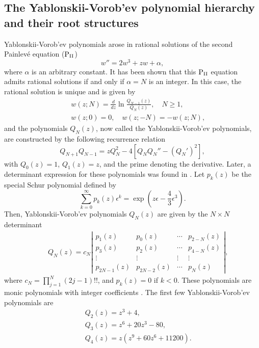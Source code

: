 \documentclass[amsmath,amssymb]{revtex4}
\def\[{\begin{equation}}
\def\]{\end{equation}}
\begin{document}
\subsection{The Yablonskii-Vorob'ev polynomial hierarchy and their root structures} \label{secPII}
Yablonskii-Vorob'ev polynomials arose in rational solutions of the second Painlev\'{e} equation ($\mbox{P}_{\mbox{\scriptsize II}}$) \cite{Yablonskii1959,Vorobev1965}
\[\label{PII}
w''=2 w^3+ z w+\alpha,
\]
where $\alpha$ is an arbitrary constant. It has been shown that this $\mbox{P}_{\mbox{\scriptsize II}}$ equation admits rational solutions if and only if $\alpha=N$ is an integer. In this case, the rational solution is unique and is given by
\begin{eqnarray}
&& w(z; N)= \frac{d}{dz} \ln\frac{Q_{N-1}(z)}{Q_{N}(z)}, \quad N\ge 1,   \label{wzn1}\\
&& w(z; 0)=0, \quad w(z; -N)=-w(z; N),      \label{wzn2}
\end{eqnarray}
and the polynomials $Q_N(z)$, now called the Yablonskii-Vorob'ev polynomials, are constructed by the following recurrence relation
\[
Q_{N+1}Q_{N-1}= z Q_{N}^2 -4 \left[ Q_{N}Q_{N}''-(Q_{N}')^2 \right],
\]
with $Q_{0}(z)=1$, $Q_{1}(z)=z$, and the prime denoting the derivative. Later, a determinant expression for these polynomials was found in \cite{Kajiwara-Ohta1996}. Let $p_{k}(z)$ be the special Schur polynomial defined by
\begin{equation}
\sum_{k=0}^{\infty}p_k(z) \epsilon^k =\exp\left( z \epsilon - \frac{4}{3}\epsilon^3 \right).
\end{equation}
Then, Yablonskii-Vorob'ev polynomials $Q_{N}(z)$ are given by the $N \times N$ determinant \cite{Kajiwara-Ohta1996}
\begin{eqnarray}
&& Q_{N}(z) = c_{N} \left| \begin{array}{cccc}
         p_{1}(z) & p_{0}(z) & \cdots &  p_{2-N}(z) \\
         p_{3}(z) & p_{2}(z) & \cdots &  p_{4-N}(z) \\
        \vdots& \vdots & \vdots & \vdots \\
         p_{2N-1}(z) & p_{2N-2}(z) & \cdots &  p_{N}(z)
       \end{array}
 \right|,
\end{eqnarray}
where $c_{N}= \prod_{j=1}^{N}(2j-1)!!$, and $p_{k}(z)= 0$ if $k<0$. These polynomials are monic polynomials with integer coefficients \cite{Clarkson2003-II}. The first few Yablonskii-Vorob'ev polynomials are
\begin{eqnarray*}
&& Q_2(z)=z^3+4, \\
&& Q_3(z)=z^6 + 20z^3 - 80,  \\
&& Q_4(z)=z(z^9 + 60z^6 + 11200).
\end{eqnarray*}
\end{document}
